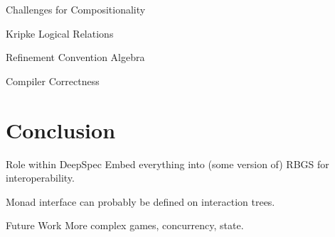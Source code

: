 \documentclass{beamer}
\begin{document}
\begin{frame}{Challenges for Compositionality} %
\end{frame}

\begin{frame}{Kripke Logical Relations} %
\end{frame}

\begin{frame}{Refinement Convention Algebra} %
\end{frame}

\begin{frame}{Compiler Correctness} %
\end{frame}

\section{Conclusion}

\begin{frame}{Role within DeepSpec} %
Embed everything into (some version of) RBGS for interoperability.

Monad interface can probably be defined on interaction trees.
\end{frame}

\begin{frame}{Future Work} %
More complex games, concurrency, state.
\end{frame}
\end{document}
